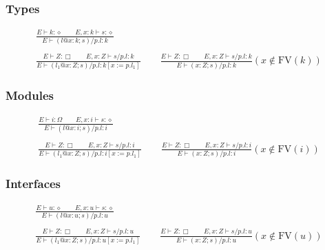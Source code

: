 \documentclass[twoside]{article}
\newcommand{\f}[1]{\mbox{#1}}
\begin{document}
\subsubsection*{Types \hfill
{}
}

\begin{displaymath}
\begin{array}{c}
\displaystyle
\frac{
E \vdash k : \diamond
\qquad
E,x:k \vdash s : \diamond
}{
E \vdash (l@x:k;s)/p.l : k
}
\\\\\displaystyle
\frac{
E \vdash Z : \Box
\qquad
E,x:Z \vdash s/p.l : k
}{
E \vdash (l_1@x:Z;s)/p.l : k[x:=p.l_1]
}
\qquad
\frac{
E \vdash Z : \Box
\qquad
E,x:Z \vdash s/p.l : k
}{
E \vdash (x:Z;s)/p.l : k
}(x \notin \f{FV}(k))
\end{array}
\end{displaymath}



\subsubsection*{Modules \hfill
{}
}

\begin{displaymath}
\begin{array}{c}
\displaystyle
\frac{
E \vdash i : \Omega
\qquad
E,x:i \vdash s : \diamond
}{
E \vdash (l@x:i;s)/p.l : i
}
\\\\\displaystyle
\frac{
E \vdash Z : \Box
\qquad
E,x:Z \vdash s/p.l : i
}{
E \vdash (l_1@x:Z;s)/p.l : i[x:=p.l_1]
}
\qquad
\frac{
E \vdash Z : \Box
\qquad
E,x:Z \vdash s/p.l : i
}{
E \vdash (x:Z;s)/p.l : i
}(x \notin \f{FV}(i))
\end{array}
\end{displaymath}



\subsubsection*{Interfaces \hfill
{}
}

\begin{displaymath}
\begin{array}{c}
\displaystyle
\frac{
E \vdash u : \diamond
\qquad
E,x:u \vdash s : \diamond
}{
E \vdash (l@x:u;s)/p.l : u
}
\\\\\displaystyle
\frac{
E \vdash Z : \Box
\qquad
E,x:Z \vdash s/p.l : u
}{
E \vdash (l_1@x:Z;s)/p.l : u[x:=p.l_1]
}
\qquad
\frac{
E \vdash Z : \Box
\qquad
E,x:Z \vdash s/p.l : u
}{
E \vdash (x:Z;s)/p.l : u
}(x \notin \f{FV}(u))
\end{array}
\end{displaymath}
\end{document}
